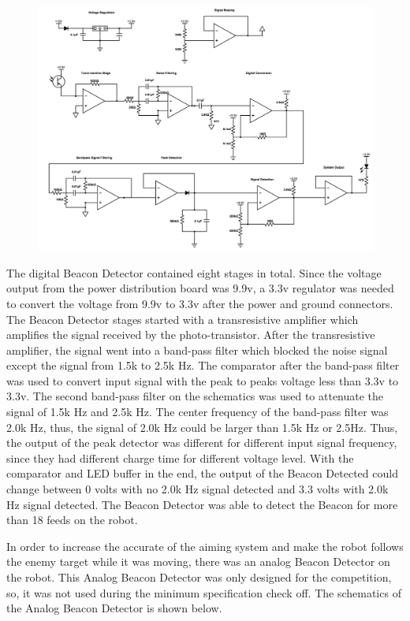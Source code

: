\documentclass{article}
\begin{document}
\begin{figure}[H]
    \centering
    \includegraphics[scale = 0.4]{Digital_Beacon_Detector_Schematics.png}
\end{figure}

The digital Beacon Detector contained eight stages in total. Since the voltage output from the power distribution board was 9.9v, a 3.3v regulator was needed to convert the voltage from 9.9v to 3.3v after the power and ground connectors. The Beacon Detector stages started with a transresistive amplifier which amplifies the signal received by the photo-transistor. After the transresistive amplifier, the signal went into a band-pass filter which blocked the noise signal except the signal from 1.5k to 2.5k Hz. The comparator after the band-pass filter was used to convert input signal with the peak to peaks voltage less than 3.3v to 3.3v. The second band-pass filter on the schematics was used to attenuate the signal of 1.5k Hz and 2.5k Hz. The center frequency of the band-pass filter was 2.0k Hz, thus, the signal of 2.0k Hz could be larger than 1.5k Hz or 2.5Hz. Thus, the output of the peak detector was different for different input signal frequency, since they had different charge time for different voltage level. With the comparator and LED buffer in the end, the output of the Beacon Detected could change between 0 volts with no 2.0k Hz signal detected and 3.3 volts with 2.0k Hz signal detected. The Beacon Detector was able to detect the Beacon for more than 18 feeds on the robot. 

In order to increase the accurate of the aiming system and make the robot follows the enemy target while it was moving, there was an analog Beacon Detector on the robot. This Analog Beacon Detector was only designed for the competition, so, it was not used during the minimum specification check off. The schematics of the Analog Beacon Detector is shown below.
\end{document}

